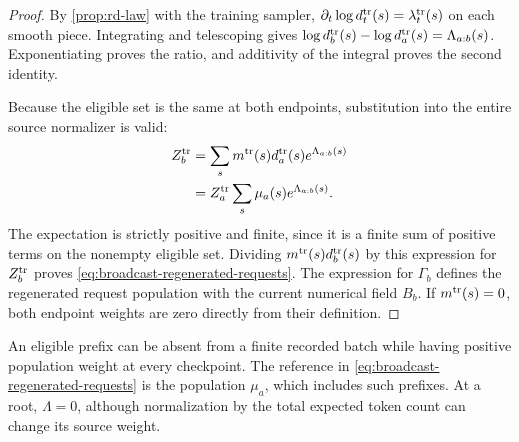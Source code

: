\begin{proof}
By \cref{prop:rd-law} with the training sampler, $\partial_t\log d_t^{\rm tr}(s)=\lambda_t^{\rm tr}(s)$ on each smooth piece. Integrating and telescoping gives $\log d_b^{\rm tr}(s)-\log d_a^{\rm tr}(s)=\Lambda_{a:b}(s)$. Exponentiating proves the ratio, and additivity of the integral proves the second identity.

Because the eligible set is the same at both endpoints, substitution into the entire source normalizer is valid:
\begin{align*}
 Z_b^{\rm tr}
 &=\sum_s m^{\rm tr}(s)d_a^{\rm tr}(s)e^{\Lambda_{a:b}(s)}\\
 &=Z_a^{\rm tr}\sum_s\mu_a(s)e^{\Lambda_{a:b}(s)}.
\end{align*}
The expectation is strictly positive and finite, since it is a finite sum of positive terms on the nonempty eligible set. Dividing $m^{\rm tr}(s)d_b^{\rm tr}(s)$ by this expression for $Z_b^{\rm tr}$ proves \cref{eq:broadcast-regenerated-requests}. The expression for $\Gamma_b$ defines the regenerated request population with the current numerical field $B_b$. If $m^{\rm tr}(s)=0$, both endpoint weights are zero directly from their definition.
\end{proof}

An eligible prefix can be absent from a finite recorded batch while having positive population weight at every checkpoint. The reference in \cref{eq:broadcast-regenerated-requests} is the population $\mu_a$, which includes such prefixes. At a root, $\Lambda=0$, although normalization by the total expected token count can change its source weight.

